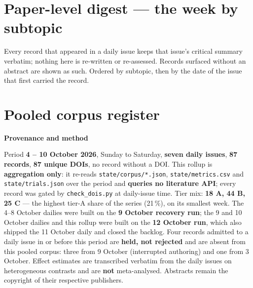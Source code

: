 \documentclass[10pt]{article}
\begin{document}
\clearpage

\section*{\sffamily\bfseries\color{Deep}Paper-level digest --- the week by subtopic}
\vspace{-1.5mm}{\color{Teal}\rule{\linewidth}{1.1pt}}\vspace{1mm}

{\fontsize{7.4}{9}\selectfont\color{Slate}Every record that appeared in a daily issue
keeps that issue's critical summary verbatim; nothing here is re-written or re-assessed.
Records surfaced without an abstract are shown as such. Ordered by subtopic, then by the
date of the issue that first carried the record.\par}



\section*{\sffamily\bfseries\color{Deep}Pooled corpus register}
\vspace{-1.5mm}{\color{Teal}\rule{\linewidth}{1.1pt}}\vspace{2.5mm}



\vspace{4mm}
\begin{keybox}
{\sffamily\bfseries\footnotesize\color{Deep}Provenance and method}\\[1.2mm]
{\fontsize{7.2}{8.8}\selectfont
Period \textbf{4 -- 10 October 2026}, Sunday to Saturday, \textbf{seven daily issues},
\textbf{87 records}, \textbf{87 unique DOIs}, no record without a DOI. This rollup is
\textbf{aggregation only}: it re-reads \texttt{state/corpus/*.json}, \texttt{state/metrics.csv} and
\texttt{state/trials.json} over the period and \textbf{queries no literature API}; every record was
gated by \texttt{check\_dois.py} at daily-issue time. Tier mix: \textbf{18 A, 44 B, 25 C} --- the
highest tier-A share of the series (21\,\%), on its smallest week. The 4--8 October dailies were built
on the \textbf{9 October recovery run}; the 9 and 10 October dailies and this rollup were built on the
\textbf{12 October run}, which also shipped the 11 October daily and closed the backlog. Four records
admitted to a daily issue in or before this period are \textbf{held, not rejected} and are absent from
this pooled corpus: three from 9 October (interrupted authoring) and one from 3 October.
Effect estimates are transcribed verbatim from the daily issues on heterogeneous contrasts and are
\textbf{not} meta-analysed. Abstracts remain the copyright of their respective publishers.\par}
\end{keybox}
\end{document}
